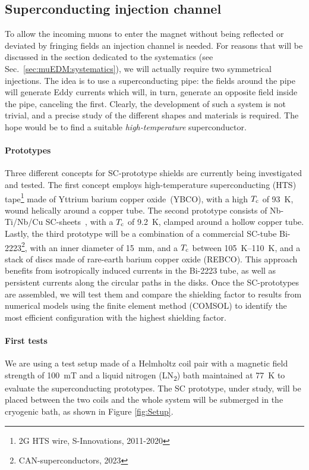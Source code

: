 \begin{refsection}
    \subsection{Superconducting injection channel}
    \label{sec:muEDM:injection}
        To allow the incoming muons to enter the magnet without being reflected or deviated by fringing fields an injection channel is needed.
        For reasons that will be discussed in the section dedicated to the systematics (see Sec.~\ref{sec:muEDM:systematics}), we will actually require two symmetrical injections.
        The idea is to use a superconducting pipe: the fields around the pipe will generate Eddy currents which will, in turn, generate an opposite field inside the pipe, canceling the first.
        Clearly, the development of such a system is not trivial, and a precise study of the different shapes and materials is required. 
        The hope would be to find a suitable \textit{high-temperature} superconductor.

        \paragraph{Prototypes}
        Three different concepts for SC-prototype shields are currently being investigated and tested. 
        The first concept employs high-temperature superconducting (HTS) tape\footnote{2G HTS wire, S-Innovations, 2011-2020} made of Yttrium barium copper oxide~(YBCO), with a high $T_{\rm c}$ of \SI{93}{K}, wound helically around a copper tube. The second prototype consists of Nb-Ti/Nb/Cu SC-sheets~\cite{Barna2018}, with a $T_{\rm c}$ of \SI{9.2}{K}, clamped around a hollow copper tube. 
        Lastly, the third prototype will be a combination of a commercial SC-tube Bi-2223\footnote{CAN-superconductors, 2023}, with an inner diameter of \SI{15}{mm}, and a $T_{\rm c}$ between \SIrange{105}{110}{K}, and a stack of discs made of rare-earth barium copper oxide (REBCO)\@. 
        This approach benefits from isotropically induced currents in the Bi-2223 tube, as well as persistent currents along the circular paths in the disks.
        Once the SC-prototypes are assembled, we will test them and compare the shielding factor to results from numerical models using the finite element method (COMSOL) to identify the most efficient configuration with the highest shielding factor. 

        \paragraph{First tests}
        We are using a test setup made of a Helmholtz coil pair with a magnetic field strength of \SI{100}{mT} and a liquid nitrogen (LN\textsubscript{2}) bath maintained at \SI{77}{K} to evaluate the superconducting prototypes. 
        The SC prototype, under study, will be placed between the two coils and the whole system will be submerged in the cryogenic bath, as shown in Figure \ref{fig:Setup}.


\end{refsection}
